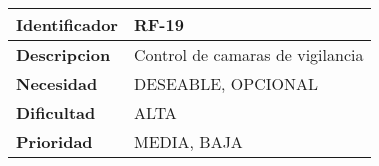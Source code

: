 \begin{center}
    \begin{tabular}{|p{2.6cm}|p{12cm}|}
    \hline
    \textbf{Identificador} & RF-19\\
    \hline
    \textbf{Descripcion} & Control de camaras de vigilancia\\
    \hline
    \textbf{Necesidad} & DESEABLE, OPCIONAL\\
    \hline
    \textbf{Dificultad} & ALTA\\
    \hline
    \textbf{Prioridad} & MEDIA, BAJA\\
    \hline
    \end{tabular}
\end{center}
